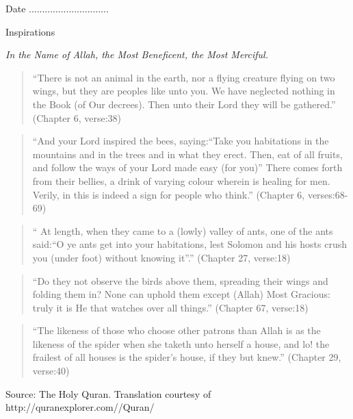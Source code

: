 \begin{titlepage}
\newline
Date ..............................\\
\newpage
\begin{center}
\noindent
\begin{Large}
Inspirations
\end{Large}
\large
\textit{In the Name of Allah, the Most Beneficent, the Most Merciful.}
\HRule
\end{center}
\begin{verse}
``There is not an animal in the earth, nor a flying creature flying on two wings, but they are peoples like unto you. We have neglected nothing in the Book (of Our decrees). Then unto their Lord they will be gathered.'' (Chapter 6, verse:38)
\end{verse}

\begin{verse}
``And your Lord inspired the bees, saying:``Take you habitations in the mountains and in the trees and in what they erect. Then, eat of all fruits, and follow the ways of your Lord made easy (for you)'' There comes forth from their bellies, a drink of varying colour wherein is healing for men. Verily, in this is indeed a sign for people who think.''
(Chapter 6, verses:68-69)
\end{verse}

\begin{verse}
`` At length, when they came to a (lowly) valley of ants, one of the ants said:``O ye ants get into your habitations, lest Solomon and his hosts crush you (under foot) without knowing it''.''
(Chapter 27, verse:18) 
\end{verse}

\begin{verse}
``Do they not observe the birds above them, spreading their wings and folding them in? None can uphold them except (Allah) Most Gracious: truly it is He that watches over all things.'' 
(Chapter 67, verse:18)
\end{verse}

\begin{verse}
``The likeness of those who choose other patrons than Allah is as the likeness of the spider when she taketh unto herself a house, and lo! the frailest of all houses is the spider's house, if they but knew.''
(Chapter 29, verse:40) 
\end{verse}
\HRule
\newline
Source: The Holy Quran. Translation courtesy of http://quranexplorer.com//Quran/
\end{titlepage}
